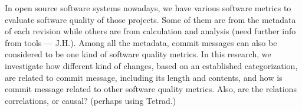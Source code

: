 In open source software systems nowadays, we have various software metrics to evaluate software quality of those projects. 
Some of them are from the metadata of each revision while others are from calculation and analysis (need further info from tools --- J.H.).
Among all the metadata, commit messages can also be considered to be one kind of software quality metrics. 
In this research, we investigate how different kind of changes, based on an established categorization, are related to commit message, including its length and contents, and how is commit message related to other software quality metrics.
Also, are the relations correlations, or causal? (perhaps using Tetrad.)
